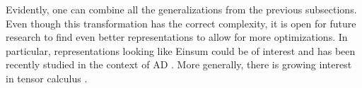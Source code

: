 Evidently, one can combine all the generalizations from the previous subsections.
Even though this transformation has the correct complexity, it is open for future research to find
even better representations to allow for more optimizations. 
In particular, representations looking like Einsum \cite{van2011numpy} could be of interest 
and has been recently studied in the context of AD \cite{laue2018computing,laue2020simple}.
More generally, there is growing interest in tensor calculus \cite{liao2019differentiable,bernstein2020differentiating}.
